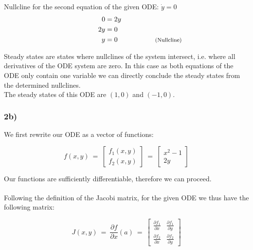 \documentclass[]{scrartcl}
\begin{document}
\begin{center}
Nullcline for the second equation of the given ODE: $\dot{y} = 0$
\begin{align*}
	0  & = 2y &					&  \\
	2y & = 0  &					&  \\
	 y & = 0  & \hspace{4em}	& \rlap{\footnotesize (Nullcline)} \\
\end{align*}
\end{center}

Steady states are states where nullclines of the system intersect, i.e. where all derivatives of the ODE system are zero.
In this case as both equations of the ODE only contain one variable we can directly conclude the steady states from the determined nullclines.
\\
The steady states of this ODE are $(1,0)$ and $(-1,0)$.




\subsubsection*{2b)}

We first rewrite our ODE as a vector of functions:

\[
f(x,y) ~=~ \left[ \begin{array}{c} f_1(x,y) \\ f_2(x,y) \end{array} \right] ~=~ \left[ \begin{array}{c} x^2 - 1 \\ 2y \end{array} \right]
\]

Our functions are sufficiently differentiable, therefore we can proceed.
\\ \\
Following the definition of the Jacobi matrix, for the given ODE we thus have the following matrix:

\[
J(x,y) ~=~ \frac{\partial f}{\partial x}(a) ~=~
\begin{bmatrix}
  \frac{\partial f_1}{\partial x} & \frac{\partial f_1}{\partial y} \\[1ex] %
  \frac{\partial f_2}{\partial x} & \frac{\partial f_2}{\partial y}
\end{bmatrix}
\]
\end{document}

